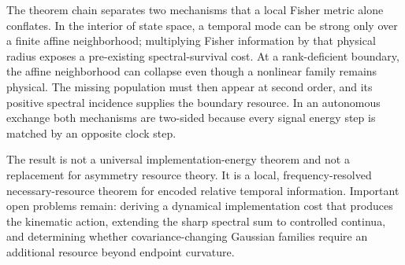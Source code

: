 \documentclass[aps,pra,preprint,nofootinbib]{revtex4-2}
\begin{document}
The theorem chain separates two mechanisms that a local Fisher metric alone conflates. In the interior of state space, a temporal mode can be strong only over a finite affine neighborhood; multiplying Fisher information by that physical radius exposes a pre-existing spectral-survival cost. At a rank-deficient boundary, the affine neighborhood can collapse even though a nonlinear family remains physical. The missing population must then appear at second order, and its positive spectral incidence supplies the boundary resource. In an autonomous exchange both mechanisms are two-sided because every signal energy step is matched by an opposite clock step.

The result is not a universal implementation-energy theorem and not a replacement for asymmetry resource theory. It is a local, frequency-resolved necessary-resource theorem for encoded relative temporal information. Important open problems remain: deriving a dynamical implementation cost that produces the kinematic action, extending the sharp spectral sum to controlled continua, and determining whether covariance-changing Gaussian families require an additional resource beyond endpoint curvature.


\end{document}
